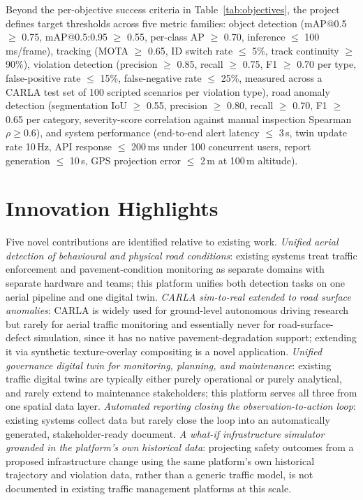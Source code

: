 \documentclass[conference]{IEEEtran}
\begin{document}
Beyond the per-objective success criteria in Table~\ref{tab:objectives}, the project defines target thresholds across five metric families: object detection (mAP@0.5 $\geq$ 0.75, mAP@0.5:0.95 $\geq$ 0.55, per-class AP $\geq$ 0.70, inference $\leq$ 100\,ms/frame), tracking (MOTA $\geq$ 0.65, ID switch rate $\leq$ 5\%, track continuity $\geq$ 90\%), violation detection (precision $\geq$ 0.85, recall $\geq$ 0.75, F1 $\geq$ 0.70 per type, false-positive rate $\leq$ 15\%, false-negative rate $\leq$ 25\%, measured across a CARLA test set of 100 scripted scenarios per violation type), road anomaly detection (segmentation IoU $\geq$ 0.55, precision $\geq$ 0.80, recall $\geq$ 0.70, F1 $\geq$ 0.65 per category, severity-score correlation against manual inspection Spearman $\rho \geq 0.6$), and system performance (end-to-end alert latency $\leq$ 3\,s, twin update rate 10\,Hz, API response $\leq$ 200\,ms under 100 concurrent users, report generation $\leq$ 10\,s, GPS projection error $\leq$ 2\,m at 100\,m altitude).

\section{Innovation Highlights}
\label{sec:novelty}

Five novel contributions are identified relative to existing work. \textit{Unified aerial detection of behavioural and physical road conditions}: existing systems treat traffic enforcement and pavement-condition monitoring as separate domains with separate hardware and teams; this platform unifies both detection tasks on one aerial pipeline and one digital twin. \textit{CARLA sim-to-real extended to road surface anomalies}: CARLA is widely used for ground-level autonomous driving research but rarely for aerial traffic monitoring and essentially never for road-surface-defect simulation, since it has no native pavement-degradation support; extending it via synthetic texture-overlay compositing is a novel application. \textit{Unified governance digital twin for monitoring, planning, and maintenance}: existing traffic digital twins are typically either purely operational or purely analytical, and rarely extend to maintenance stakeholders; this platform serves all three from one spatial data layer. \textit{Automated reporting closing the observation-to-action loop}: existing systems collect data but rarely close the loop into an automatically generated, stakeholder-ready document. \textit{A what-if infrastructure simulator grounded in the platform's own historical data}: projecting safety outcomes from a proposed infrastructure change using the same platform's own historical trajectory and violation data, rather than a generic traffic model, is not documented in existing traffic management platforms at this scale.
\end{document}
